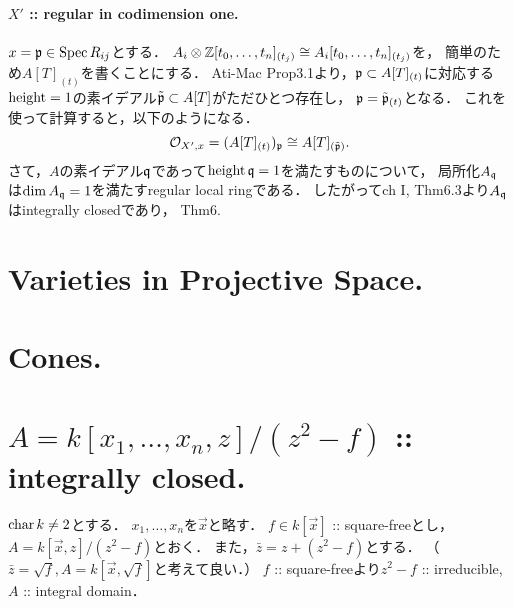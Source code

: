 \documentclass[a4paper]{jsarticle}
\newcommand{\shO}{\mathcal{O}}
\begin{document}
    \paragraph{$X'$ :: regular in codimension one.}
    $x=\mathfrak{p} \in \operatorname{Spec} R_{ij}$とする．
    $A_i \otimes \mathbb{Z}[t_0,\dots,t_n]_{(t_j)} \cong A_i[t_0,\dots,t_n]_{(t_j)}$を，
    簡単のため$A[T]_{(t)}$を書くことにする．
    Ati-Mac Prop3.1より，$\mathfrak{p} \subset A[T]_{(t)}$に対応する
    $\operatorname{height}=1$の素イデアル$\tilde{\mathfrak{p}} \subset A[T]$がただひとつ存在し，
    $\mathfrak{p}=\tilde{\mathfrak{p}}_{(t)}$となる．
    これを使って計算すると，以下のようになる．
    \[ \shO_{X',x}=(A[T]_{(t)})_{\I{p}} \cong A[T]_{(\tilde{\I{p}})}. \]
    さて，$A$の素イデアル$\mathfrak{q}$であって$\operatorname{height} \mathfrak{q}=1$を満たすものについて，
    局所化$A_{\mathfrak{q}}$は$\dim A_{\mathfrak{q}}=1$を満たすregular local ringである．
    したがってch I, Thm6.3より$A_{\mathfrak{q}}$はintegrally closedであり，
    Thm6.

\section{Varieties in Projective Space.} %

\section{Cones.} %

\section{$A=k[x_1,\dots,x_n,z]/(z^2-f)$ :: integrally closed.} %
    $\operatorname{char} k \neq 2$とする．
    $x_1,\dots,x_n$を$\vec{x}$と略す．
    $f \in k[\vec{x}]$ :: square-freeとし，
    $A=k[\vec{x},z]/(z^2-f)$とおく．
    また，$\bar{z}=z+(z^2-f)$とする．
    （$\bar{z}=\sqrt{f}, A=k[\vec{x}, \sqrt{f}]$と考えて良い．）
    $f$ :: square-freeより$z^2-f$ :: irreducible, $A$ :: integral domain．
\end{document}
